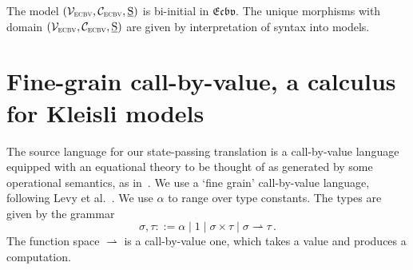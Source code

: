 \documentclass{LMCS}
\newcommand{\pto}{\rightharpoonup}
\newcommand{\states}{{\underline{\mathrm{S}}}}
\newcommand{\SynEnrichedModel}{(\VSynE,\CSynE, \states)}
\newcommand{\VSynE}{\mathcal{V}_{\textsc{ecbv}}}
\newcommand{\CSynE}{\mathcal{C}_{\textsc{ecbv}}}
\newcommand{\CATECBV}{\TwoCatFont{Ecbv}}
\newcommand{\TwoCatFont}[1]{\mathfrak{#1}}
\begin{document}
\begin{thm} \label{thm:ecbv:biinitial}
The model $\SynEnrichedModel$ is bi-initial in $\CATECBV$. The unique 
morphisms with domain $\SynEnrichedModel$ are given by interpretation of syntax into models.
\end{thm}





\section{Fine-grain call-by-value, a calculus for Kleisli models}
\label{sec:fgcbv}

The source language for our state-passing translation is a call-by-value language equipped with an equational theory to be thought of as generated by some operational semantics, as in~\cite{Plotkin:65}. 
We use a `fine grain' call-by-value language, 
following Levy et al.~\cite{Levy:03,Levy:book}.
We use $\alpha$ to range over type constants. The types are given by the grammar
\[\sigma,\tau ::= 
\alpha \mid 1 \mid \sigma \times \tau \mid
\sigma \pto \tau \, .
\]
The function space $\pto$ is a call-by-value
one, which takes a value and produces a computation. 
\end{document}
